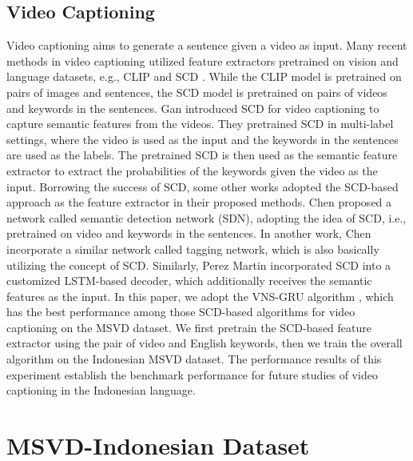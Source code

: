 \documentclass{article}
\begin{document}
\subsection{Video Captioning}
Video captioning aims to generate a sentence given a video as input. Many recent methods in video captioning utilized feature extractors pretrained on vision and language datasets, e.g., CLIP \cite{Radford2021LearningTV} and SCD \cite{SCN_CVPR2017}. While the CLIP model is pretrained on pairs of images and sentences, the SCD model is pretrained on pairs of videos and keywords in the sentences. Gan \etal \cite{SCN_CVPR2017} introduced SCD for video captioning to capture semantic features from the videos. They pretrained SCD in multi-label settings, where the video is used as the input and the keywords in the sentences are used as the labels. The pretrained SCD is then used as the semantic feature extractor to extract the probabilities of the keywords given the video as the input. Borrowing the success of SCD, some other works \cite{DBLP:conf/ecai/Chen0020a, 10.3389/frobt.2020.475767, Perez-Martin_2021_WACV, 9412898} adopted the SCD-based approach as the feature extractor in their proposed methods. Chen \etal \cite{10.3389/frobt.2020.475767} proposed a network called semantic detection network (SDN), adopting the idea of SCD, i.e., pretrained on video and keywords in the sentences. In another work, Chen \etal \cite{DBLP:conf/ecai/Chen0020a} incorporate a similar network called tagging network, which is also basically utilizing the concept of SCD. Similarly, Perez Martin \etal \cite{Perez-Martin_2021_WACV, 9412898} incorporated SCD into a customized LSTM-based decoder, which additionally receives the semantic features as the input. In this paper, we adopt the VNS-GRU algorithm \cite{DBLP:conf/ecai/Chen0020a}, which has the best performance among those SCD-based algorithms for video captioning on the MSVD dataset. We first pretrain the SCD-based feature extractor using the pair of video and English keywords, then we train the overall algorithm on the Indonesian MSVD dataset. The performance results of this experiment establish the benchmark performance for future studies of video captioning in the Indonesian language.

\section{MSVD-Indonesian Dataset}
\end{document}
